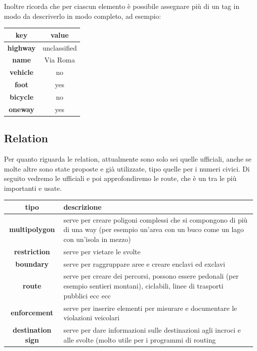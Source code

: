 \documentclass[a4paper,twoside,12pt,]{article}
\newcommand{\key}[1]{\textsf{\textbf{#1}}}
\newcommand{\val}[1]{\textsf{#1}}
\begin{document}
Inoltre ricorda che per ciascun elemento è possibile assegnare più di un tag in modo da descriverlo in modo completo, ad esempio:
\begin{center}
 \begin{tabular}{cc}
  \toprule
   \textbf{key} & \textbf{value} \\
  \midrule
   \key{highway} & \val{unclassified} \\
   \key{name} & \val{Via Roma} \\
   \key{vehicle} & \val{no} \\
   \key{foot} & \val{yes} \\
   \key{bicycle} & \val{no} \\
   \key{oneway} & \val{yes} \\
  \bottomrule
 \end{tabular}
\end{center}

\subsection{Relation}
Per quanto riguarda le relation, attualmente sono solo sei quelle ufficiali, anche se molte altre sono state proposte e già utilizzate, tipo quelle per i numeri civici. Di seguito vedremo le ufficiali e poi approfondiremo le route, che è un tra le più importanti e usate.
\begin{center}
 \begin{tabular}{c p{9cm}}
  \toprule
   \textbf{tipo} & \textbf{descrizione} \\
  \midrule
   \key{multipolygon} & serve per creare poligoni complessi che si compongono di più di una way (per esempio un'area con un buco come un lago con un'isola in mezzo) \\
   \key{restriction}	& serve per vietare le svolte \\
   \key{boundary}	& serve per raggruppare aree e creare enclavi ed exclavi \\
   \key{route} & serve per creare dei percorsi, possono essere pedonali (per esempio sentieri montani), ciclabili, linee di trasporti pubblici ecc ecc \\
   \key{enforcement} & serve per inserire elementi per misurare e documentare le violazioni veicolari \\
   \key{destination sign} & serve per dare informazioni sulle destinazioni agli incroci e alle svolte (molto utile per i programmi di routing \\
  \bottomrule
\end{tabular}
\end{center}
\end{document}
